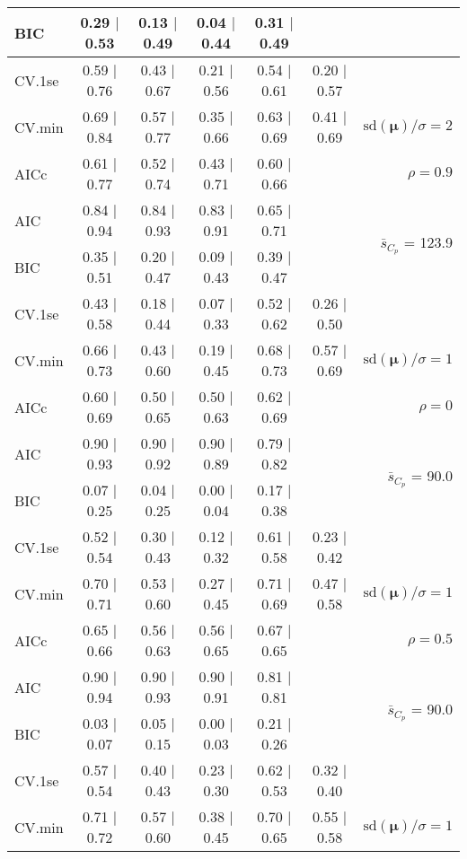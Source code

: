\documentclass[12pt]{article}
\newcommand{\mr}[1]{\mathrm{#1}}
\newcommand{\bm}[1]{\mathbf{#1}}
\begin{document}
\begin{table}[p]
\begin{center}
\begin{tabular}{l*{5}{c}|r}
BIC & 0.29 $\mid$ 0.53 & 0.13 $\mid$ 0.49 & 0.04 $\mid$ 0.44 & 0.31 $\mid$ 0.49 & & \\
 \hline 
CV.1se & 0.59 $\mid$ 0.76 & 0.43 $\mid$ 0.67 & 0.21 $\mid$ 0.56 & 0.54 $\mid$ 0.61 & 0.20 $\mid$ 0.57 &\\
CV.min & 0.69 $\mid$ 0.84 & 0.57 $\mid$ 0.77 & 0.35 $\mid$ 0.66 & 0.63 $\mid$ 0.69 & 0.41 $\mid$ 0.69 &  $\mr{sd}(\bm{\mu})/\sigma=2$ \\
AICc & 0.61 $\mid$ 0.77 & 0.52 $\mid$ 0.74 & 0.43 $\mid$ 0.71 & 0.60 $\mid$ 0.66 & & $\rho=0.9$ \\
AIC & 0.84 $\mid$ 0.94 & 0.84 $\mid$ 0.93 & 0.83 $\mid$ 0.91 & 0.65 $\mid$ 0.71 & & \multirow{2}{*}{$\bar{s}_{C_p}$ = 123.9} \\
BIC & 0.35 $\mid$ 0.51 & 0.20 $\mid$ 0.47 & 0.09 $\mid$ 0.43 & 0.39 $\mid$ 0.47 & & \\
 \hline 
CV.1se & 0.43 $\mid$ 0.58 & 0.18 $\mid$ 0.44 & 0.07 $\mid$ 0.33 & 0.52 $\mid$ 0.62 & 0.26 $\mid$ 0.50 &\\
CV.min & 0.66 $\mid$ 0.73 & 0.43 $\mid$ 0.60 & 0.19 $\mid$ 0.45 & 0.68 $\mid$ 0.73 & 0.57 $\mid$ 0.69 &  $\mr{sd}(\bm{\mu})/\sigma=1$ \\
AICc & 0.60 $\mid$ 0.69 & 0.50 $\mid$ 0.65 & 0.50 $\mid$ 0.63 & 0.62 $\mid$ 0.69 & & $\rho=0$ \\
AIC & 0.90 $\mid$ 0.93 & 0.90 $\mid$ 0.92 & 0.90 $\mid$ 0.89 & 0.79 $\mid$ 0.82 & & \multirow{2}{*}{$\bar{s}_{C_p}$ = 90.0} \\
BIC & 0.07 $\mid$ 0.25 & 0.04 $\mid$ 0.25 & 0.00 $\mid$ 0.04 & 0.17 $\mid$ 0.38 & & \\
 \hline 
CV.1se & 0.52 $\mid$ 0.54 & 0.30 $\mid$ 0.43 & 0.12 $\mid$ 0.32 & 0.61 $\mid$ 0.58 & 0.23 $\mid$ 0.42 &\\
CV.min & 0.70 $\mid$ 0.71 & 0.53 $\mid$ 0.60 & 0.27 $\mid$ 0.45 & 0.71 $\mid$ 0.69 & 0.47 $\mid$ 0.58 &  $\mr{sd}(\bm{\mu})/\sigma=1$ \\
AICc & 0.65 $\mid$ 0.66 & 0.56 $\mid$ 0.63 & 0.56 $\mid$ 0.65 & 0.67 $\mid$ 0.65 & & $\rho=0.5$ \\
AIC & 0.90 $\mid$ 0.94 & 0.90 $\mid$ 0.93 & 0.90 $\mid$ 0.91 & 0.81 $\mid$ 0.81 & & \multirow{2}{*}{$\bar{s}_{C_p}$ = 90.0} \\
BIC & 0.03 $\mid$ 0.07 & 0.05 $\mid$ 0.15 & 0.00 $\mid$ 0.03 & 0.21 $\mid$ 0.26 & & \\
 \hline 
CV.1se & 0.57 $\mid$ 0.54 & 0.40 $\mid$ 0.43 & 0.23 $\mid$ 0.30 & 0.62 $\mid$ 0.53 & 0.32 $\mid$ 0.40 &\\
CV.min & 0.71 $\mid$ 0.72 & 0.57 $\mid$ 0.60 & 0.38 $\mid$ 0.45 & 0.70 $\mid$ 0.65 & 0.55 $\mid$ 0.58 &  $\mr{sd}(\bm{\mu})/\sigma=1$ \\

\end{tabular}
\end{center}
\end{table}
\end{document}
